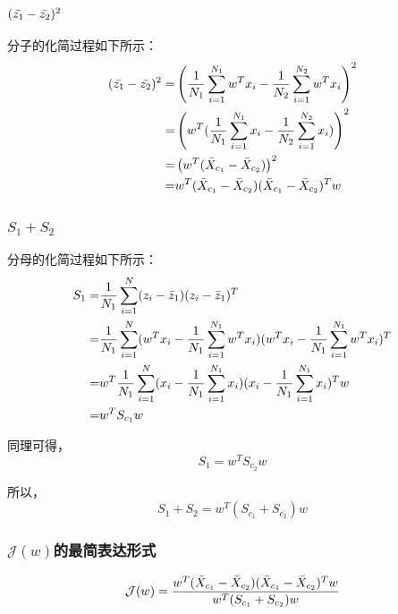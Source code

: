 \documentclass[a4paper]{article}
\begin{document}
\subsubsection{$(\Bar{z_1}-\Bar{z_2})^2$}
分子的化简过程如下所示：
\begin{equation}
    \begin{split}
        (\Bar{z_1}-\Bar{z_2})^2 
        = & \left( \frac{1}{N_1}\sum_{i=1}^{N_1}w^Tx_i - \frac{1}{N_2}\sum_{i=1}^{N_2}w^Tx_i \right)^2 \\
        = & \left( w^T(\frac{1}{N_1}\sum_{i=1}^{N_1}x_i - \frac{1}{N_2}\sum_{i=1}^{N_2}x_i ) \right)^2 \\
        = & \left( w^T(\Bar{X}_{c_1} - \Bar{X}_{c_2}) \right)^2 \\
        = & w^T(\Bar{X}_{c_1} - \Bar{X}_{c_2})(\Bar{X}_{c_1} - \Bar{X}_{c_2})^Tw \\
    \end{split}
\end{equation}

\subsubsection{$S_1+S_2$}
分母的化简过程如下所示：
\begin{equation}
    \begin{split}
        S_1 = & \frac{1}{N_1}\sum_{i=1}^N(z_i-\Bar{z}_1)(z_i-\Bar{z}_1)^T \\
        = & \frac{1}{N_1}\sum_{i=1}^N(w^Tx_i-\frac{1}{N_1}\sum_{i=1}^{N_1}w^Tx_i)(w^Tx_i-\frac{1}{N_1}\sum_{i=1}^{N_1}w^Tx_i)^T \\
        = & w^T\frac{1}{N_1}\sum_{i=1}^N(x_i-\frac{1}{N_1}\sum_{i=1}^{N_1}x_i)(x_i-\frac{1}{N_1}\sum_{i=1}^{N_1}x_i)^Tw \\
        = & w^TS_{c_1}w \\
    \end{split}
\end{equation}

同理可得，
\begin{equation}
    S_1 = w^TS_{c_2}w
\end{equation}


所以，
\begin{equation}
    S_1+S_2=w^T(S_{c_1}+S_{c_2})w
\end{equation}

\subsubsection{$\mathcal{J}(w)$的最简表达形式}
\begin{equation}
    \mathcal{J}(w)=\frac{w^T(\Bar{X}_{c_1} - \Bar{X}_{c_2})(\Bar{X}_{c_1} - \Bar{X}_{c_2})^Tw}{w^T(S_{c_1}+S_{c_2})w}
\end{equation}
\end{document}
